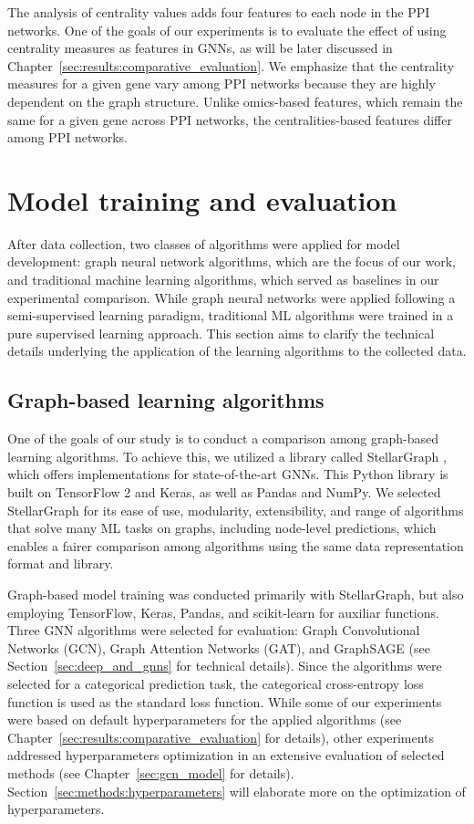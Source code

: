 The analysis of centrality values adds four features to each node in the PPI networks. One of the goals of our experiments is to evaluate the effect of using centrality measures as features in GNNs, as will be later discussed in Chapter~\ref{sec:results:comparative_evaluation}. We emphasize that the centrality measures for a given gene vary among PPI networks because they are highly dependent on the graph structure. Unlike omics-based features, which remain the same for a given gene across PPI networks, the centralities-based features differ among PPI networks.


\section{Model training and evaluation}

After data collection, two classes of algorithms were applied for model development: graph neural network algorithms, which are the focus of our work, and traditional machine learning algorithms, which served as baselines in our experimental comparison. While graph neural networks were applied following a semi-supervised learning paradigm, traditional ML algorithms were trained in a pure supervised learning approach. This section aims to clarify the technical details underlying the application of the learning algorithms to the collected data.




\subsection{Graph-based learning algorithms}
\label{sec:materials_methods:gnns}

One of the goals of our study is to conduct a comparison among graph-based learning algorithms. To achieve this, we utilized a library called StellarGraph \cite{StellarGraph}, which offers implementations for state-of-the-art GNNs. This Python library is built on TensorFlow 2 and Keras, as well as Pandas and NumPy. We selected StellarGraph for its ease of use, modularity, extensibility, and range of algorithms that solve many ML tasks on graphs, including node-level predictions, which enables a fairer comparison among algorithms using the same data representation format and library.

Graph-based model training was conducted primarily with StellarGraph, but also employing TensorFlow, Keras, Pandas, and scikit-learn for auxiliar functions.  Three GNN algorithms were selected for evaluation: Graph Convolutional Networks (GCN), Graph Attention Networks (GAT), and GraphSAGE (see Section~\ref{sec:deep_and_gnns} for technical details). Since the algorithms were selected for a categorical prediction task, the categorical cross-entropy loss function is used as the standard loss function. While some of our experiments were based on default hyperparameters for the applied algorithms (see Chapter~\ref{sec:results:comparative_evaluation} for details), other experiments addressed hyperparameters optimization in an extensive evaluation of selected methods (see Chapter~\ref{sec:gcn_model} for details). Section~\ref{sec:methods:hyperparameters} will elaborate more on the optimization of hyperparameters.


